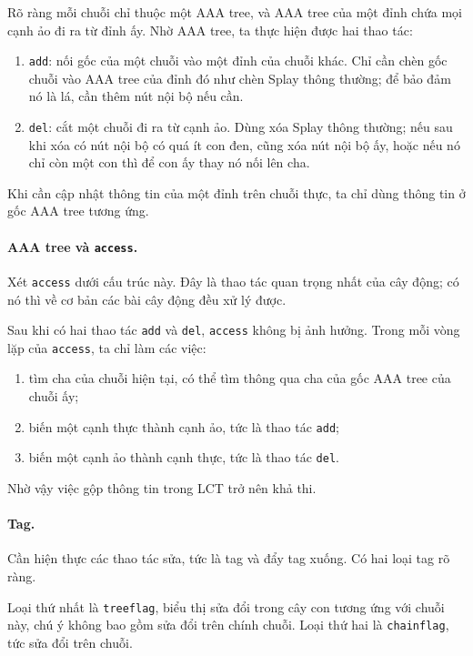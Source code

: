 \documentclass[11pt]{article}
\begin{document}
Rõ ràng mỗi chuỗi chỉ thuộc một AAA tree, và AAA tree của một đỉnh chứa mọi cạnh
ảo đi ra từ đỉnh ấy. Nhờ AAA tree, ta thực hiện được hai thao tác:
\begin{enumerate}
  \item \texttt{add}: nối gốc của một chuỗi vào một đỉnh của chuỗi khác. Chỉ cần
  chèn gốc chuỗi vào AAA tree của đỉnh đó như chèn Splay thông thường; để bảo
  đảm nó là lá, cần thêm nút nội bộ nếu cần.
  \item \texttt{del}: cắt một chuỗi đi ra từ cạnh ảo. Dùng xóa Splay thông
  thường; nếu sau khi xóa có nút nội bộ có quá ít con đen, cũng xóa nút nội bộ
  ấy, hoặc nếu nó chỉ còn một con thì để con ấy thay nó nối lên cha.
\end{enumerate}

Khi cần cập nhật thông tin của một đỉnh trên chuỗi thực, ta chỉ dùng thông tin ở
gốc AAA tree tương ứng.

\paragraph{AAA tree và \texttt{access}.}
Xét \texttt{access} dưới cấu trúc này. Đây là thao tác quan trọng nhất của cây
động; có nó thì về cơ bản các bài cây động đều xử lý được.

Sau khi có hai thao tác \texttt{add} và \texttt{del}, \texttt{access} không bị
ảnh hưởng. Trong mỗi vòng lặp của \texttt{access}, ta chỉ làm các việc:
\begin{enumerate}
  \item tìm cha của chuỗi hiện tại, có thể tìm thông qua cha của gốc AAA tree của
  chuỗi ấy;
  \item biến một cạnh thực thành cạnh ảo, tức là thao tác \texttt{add};
  \item biến một cạnh ảo thành cạnh thực, tức là thao tác \texttt{del}.
\end{enumerate}

Nhờ vậy việc gộp thông tin trong LCT trở nên khả thi.

\paragraph{Tag.}
Cần hiện thực các thao tác sửa, tức là tag và đẩy tag xuống. Có hai loại tag rõ
ràng.

Loại thứ nhất là \texttt{treeflag}, biểu thị sửa đổi trong cây con tương ứng với
chuỗi này, chú ý không bao gồm sửa đổi trên chính chuỗi. Loại thứ hai là
\texttt{chainflag}, tức sửa đổi trên chuỗi.
\end{document}
